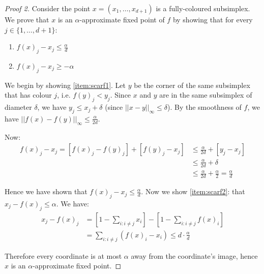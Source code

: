 \begin{proof}[Proof 2]
	Consider the point $x=(x_1,\ldots,x_{d+1})$ is a fully-coloured subsimplex.
	We prove that $x$ is an $\alpha$-approximate fixed point of $f$ by showing
	that for every $j \in \{1,\ldots,d+1\}$:
	\begin{enumerate}[label=\arabic*),ref=(\arabic*)]
		\item $f(x)_j - x_j \le \frac{\alpha}{d}$ \label{item:scarf1}
		\item $f(x)_j - x_j \ge -\alpha$ \label{item:scarf2}
	\end{enumerate}

	We begin by showing \ref{item:scarf1}. Let $y$ be the corner of the same
	subsimplex that has colour $j$, i.e. $f(y)_j < y_j$. Since $x$ and $y$ are
	in the same subsimplex of diameter $\delta$, we have $y_j \le x_j +
	\delta$ (since $||x-y||_\infty \le \delta$). By the smoothness of $f$, we
	have $||f(x)-f(y)||_\infty \le \frac{\alpha}{2d}$.

	Now:
	\begin{equation*}
		\begin{split}
			f(x)_j - x_j = [ f(x)_j - f(y)_j ] + [f(y)_j - x_j] & \le
			\frac{\alpha}{2d} + [ y_j - x_j ] \\
			& \le \frac{\alpha}{2d} + \delta \\
			& \le \frac{\alpha}{2d} + \frac{\alpha}{2} = \frac{\alpha}{d}
		\end{split}
	\end{equation*}

	Hence we have shown that $f(x)_j - x_j \le \frac{\alpha}{d}$. Now we show
	\ref{item:scarf2}: that $x_j - f(x)_j \le \alpha$. We have:
	\begin{equation*}
		\begin{split}
			x_j - f(x)_j & = [ 1 - \sum_{i:i\neq j} x_i ] - [ 1 - \sum_{i:i\neq
			j} f(x)_i ] \\
			& = \sum_{i: i \neq j} (f(x)_i - x_i) \le d \cdot \frac{\alpha}{d}
		\end{split}
	\end{equation*}

	Therefore every coordinate is at most $\alpha$ away from the coordinate's
	image, hence $x$ is an $\alpha$-approximate fixed point.
\end{proof}

